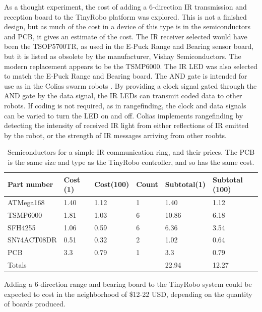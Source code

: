 As a thought experiment, the cost of adding a 6-direction IR transmission and reception board to the TinyRobo platform was explored. 
This is not a finished design, but as much of the cost in a device of this type is in the semiconductors and PCB, it gives an estimate of the cost. 
The IR receiver selected would have been the TSOP5700TR, as used in the E-Puck Range and Bearing sensor board, but it is listed as obsolete by the manufacturer, Vishay Semiconductors. 
The modern replacement appears to be the TSMP6000.
The IR LED was also selected to match the E-Puck Range and Bearing board.
The AND gate is intended for use as in the Colias swarm robots \citep{arvin2009development}.
By providing a clock signal gated through the AND gate by the data signal, the IR LEDs can transmit coded data to other robots. 
If coding is not required, as in rangefinding, the clock and data signals can be varied to turn the LED on and off. 
Colias implements rangefinding by detecting the intensity of received IR light from either reflections of IR emitted by the robot, or the strength of IR messages arriving from other roobts. 

\begin{table}
	\begin{tabular}{l l l l l l}
		Part number & Cost (1) & Cost(100) & Count & Subtotal(1) & Subtotal (100)\\
		\hline 
		ATMega168 & 1.40 & 1.12 & 1 & 1.40 & 1.12  \\
		TSMP6000 & 1.81 & 1.03 & 6 & 10.86 & 6.18  \\
		SFH4255  & 1.06 & 0.59 & 6 & 6.36 & 3.54 \\
		SN74ACT08DR & 0.51 & 0.32 & 2 & 1.02 & 0.64 \\
		PCB & 3.3 & 0.79 & 1 & 3.3 & 0.79\\
		\hline 
		Totals & & & & 22.94 & 12.27\\
	\end{tabular}
	\caption{Semiconductors for a simple IR communication ring, and their prices. The PCB is the same size and type as the TinyRobo controller, and so has the same cost.}
	\label{tab:ir_ranger_board}
\end{table}

Adding a 6-direction range and bearing board to the TinyRobo system could be expected to cost in the neighborhood of \$12-22 USD, depending on the quantity of boards produced. 


